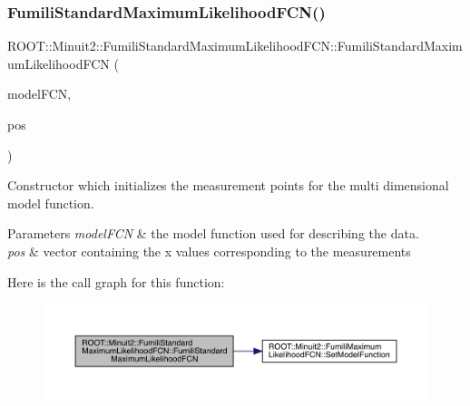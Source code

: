 \subsubsection{\texorpdfstring{FumiliStandardMaximumLikelihoodFCN()}{FumiliStandardMaximumLikelihoodFCN()}\hspace{0.1cm}{\footnotesize\ttfamily [2/4]}}
{\footnotesize\ttfamily R\+O\+O\+T\+::\+Minuit2\+::\+Fumili\+Standard\+Maximum\+Likelihood\+F\+C\+N\+::\+Fumili\+Standard\+Maximum\+Likelihood\+F\+CN (\begin{DoxyParamCaption}\item[{const \mbox{\hyperlink{classROOT_1_1Minuit2_1_1ParametricFunction}{Parametric\+Function}} \&}]{model\+F\+CN,  }\item[{const std\+::vector$<$ std\+::vector$<$ double $>$ $>$ \&}]{pos }\end{DoxyParamCaption})\hspace{0.3cm}{\ttfamily [inline]}}

Constructor which initializes the measurement points for the multi dimensional model function.


\begin{DoxyParams}{Parameters}
{\em model\+F\+CN} & the model function used for describing the data.\\
\hline
{\em pos} & vector containing the x values corresponding to the measurements \\
\hline
\end{DoxyParams}
Here is the call graph for this function\+:
\nopagebreak
\begin{figure}[H]
\begin{center}
\leavevmode
\includegraphics[width=350pt]{dd/d40/classROOT_1_1Minuit2_1_1FumiliStandardMaximumLikelihoodFCN_af233ad0d9ef029dd8aa6a145ea991483_cgraph}
\end{center}
\end{figure}
\mbox{\label{classROOT_1_1Minuit2_1_1FumiliStandardMaximumLikelihoodFCN_aa43a2e65c5083814ee9a08ee51f6abd5}} 
